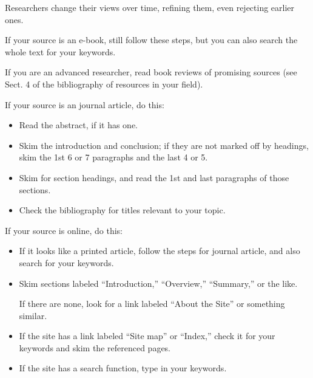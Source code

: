 \documentclass[oneside]{book}
\numberwithin{equation}{section}
\begin{document}
Researchers change their views over time, refining them, even rejecting earlier ones.

If your source is an e-book, still follow these steps, but you can also search the whole text for your keywords.

If you are an advanced researcher, read book reviews of promising sources (see Sect. 4 of the bibliography of resources in your field).

%
If your source is an journal article, do this:
\begin{itemize}
    \item Read the abstract, if it has one.
    \item Skim the introduction and conclusion; if they are not marked off by headings, skim the 1st 6 or 7 paragraphs and the last 4 or 5.
    \item Skim for section headings, and read the 1st and last paragraphs of those sections.
    \item Check the bibliography for titles relevant to your topic.
\end{itemize}
If your source is online, do this:
\begin{itemize}
    \item If it looks like a printed article, follow the steps for journal article, and also search for your keywords.
    \item Skim sections labeled ``Introduction,'' ``Overview,'' ``Summary,'' or the like.
    
    If there are none, look for a link labeled ``About the Site'' or something similar.
    \item If the site has a link labeled ``Site map'' or ``Index,'' check it for your keywords and skim the referenced pages.
    \item If the site has a search function, type in your keywords.
\end{itemize}
\end{document}
